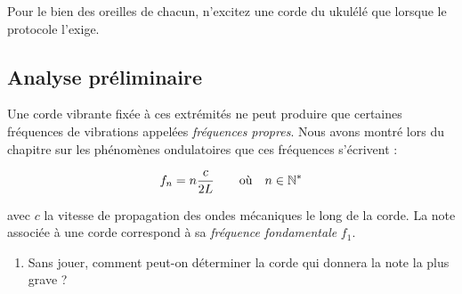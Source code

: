 \documentclass[a4paper,french,bookmarks]{article}
\begin{document}
\begin{center}
    \begin{minipage}{0.9\linewidth}
    \begin{tcolorbox}[
        breakable,
        enhanced,
        interior style      = {color=colexp!10},
        borderline north    = {.5pt}{0pt}{colexp!10},
        borderline south    = {.5pt}{0pt}{colexp!10},
        borderline west     = {.5pt}{0pt}{colexp!10},
        borderline east     = {.5pt}{0pt}{colexp!10},
        sharp corners       = downhill,
        arc                 = 0 cm,
        boxrule             = 0.5pt,
        drop fuzzy shadow   = black!50!white
    ]
        \centering Pour le bien des oreilles de chacun, n'excitez une corde du ukulélé que lorsque le protocole l'exige.
    \end{tcolorbox}
\end{minipage}

\end{center}

\subsection{Analyse préliminaire}

Une corde vibrante fixée à ces extrémités ne peut produire que certaines fréquences de vibrations appelées \textit{fréquences propres}. Nous avons montré lors du chapitre sur les phénomènes ondulatoires que ces fréquences s'écrivent :

\begin{equation}\label{eq:1}
    f_n = n\dfrac{c}{2L} \qquad \text{où} \quad n \in \mathbb{N}^*
\end{equation}

avec $c$ la vitesse de propagation des ondes mécaniques le long de la corde. La note associée à une corde correspond à sa \textit{fréquence fondamentale} $f_1$.

\begin{enumerate}[resume]
    \item Sans jouer, comment peut-on déterminer la corde qui donnera la note la plus grave ?

\end{enumerate}
\end{document}
